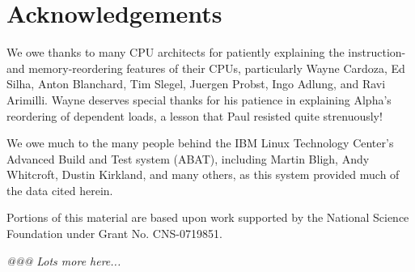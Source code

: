 
\section*{Acknowledgements}

We owe thanks to many CPU architects for patiently explaining the
instruction- and memory-reordering features of their CPUs, particularly
Wayne Cardoza, Ed Silha, Anton Blanchard, Tim Slegel, Juergen Probst,
Ingo Adlung, and Ravi Arimilli.
Wayne deserves special thanks for his patience in explaining Alpha's reordering
of dependent loads, a lesson that Paul resisted quite strenuously!

We owe much to the many people behind the IBM Linux Technology Center's
Advanced Build and Test system (ABAT), including Martin Bligh, Andy
Whitcroft, Dustin Kirkland, and many others, as this system provided much
of the data cited herein.

Portions of this material are based upon work supported by the National
Science Foundation under Grant No. CNS-0719851.

\emph{@@@ Lots more here...}
